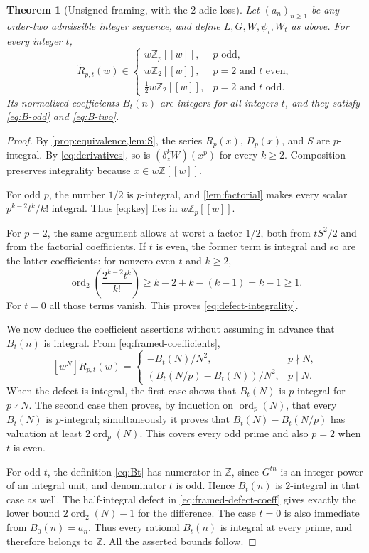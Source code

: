 \documentclass[11pt,letterpaper]{article}
\numberwithin{equation}{section}
\newtheorem{theorem}{Theorem}[section]
\theoremstyle{definition}
\theoremstyle{remark}
\newcommand{\Z}{\mathbb Z}
\newcommand{\Zp}{\mathbb Z_p}
\newcommand{\vp}{\operatorname{ord}_p}
\newcommand{\vtwo}{\operatorname{ord}_2}
\begin{document}
\begin{theorem}[Unsigned framing, with the $2$-adic loss]\label{thm:framing}
Let $(a_n)_{n\ge1}$ be any order-two admissible integer sequence,
and define $L,G,W,\psi_t,W_t$ as above. For every integer $t$,
\begin{equation}\label{eq:defect-integrality}
 \widetilde R_{p,t}(w)\in
 \begin{cases}
 w\Zp[[w]],&p\text{ odd},\\
 w\Z_2[[w]],&p=2\text{ and }t\text{ even},\\
 \tfrac12 w\Z_2[[w]],&p=2\text{ and }t\text{ odd}.
 \end{cases}
\end{equation}
Its normalized coefficients $B_t(n)$ are integers for all integers $t$,
and they satisfy \eqref{eq:B-odd} and \eqref{eq:B-two}.
\end{theorem}
\begin{proof}
By \cref{prop:equivalence,lem:S}, the series $R_p(x)$, $D_p(x)$, and $S$
are $p$-integral. By \eqref{eq:derivatives}, so is
$(\delta_z^kW)(x^p)$ for every $k\ge2$. Composition preserves integrality
because $x\in w\Z[[w]]$.

For odd $p$, the number $1/2$ is $p$-integral, and
\cref{lem:factorial} makes every scalar $p^{k-2}t^k/k!$ integral.
Thus \eqref{eq:key} lies in $w\Zp[[w]]$.

For $p=2$, the same argument allows at worst a factor $1/2$, both from
$tS^2/2$ and from the factorial coefficients. If $t$ is even, the former
term is integral and so are the latter coefficients: for nonzero even
$t$ and $k\ge2$,
\[
 \vtwo\left(\frac{2^{k-2}t^k}{k!}\right)
 \ge k-2+k-(k-1)=k-1\ge1.
\]
For $t=0$ all those terms vanish. This proves
\eqref{eq:defect-integrality}.

We now deduce the coefficient assertions without assuming in advance
that $B_t(n)$ is integral. From \eqref{eq:framed-coefficients},
\begin{equation}\label{eq:framed-defect-coeff}
 [w^N]\widetilde R_{p,t}(w)=
 \begin{cases}
 -B_t(N)/N^2,&p\nmid N,\\
 (B_t(N/p)-B_t(N))/N^2,&p\mid N.
 \end{cases}
\end{equation}
When the defect is integral, the first case shows that $B_t(N)$ is
$p$-integral for $p\nmid N$. The second case then proves, by induction
on $\vp(N)$, that every $B_t(N)$ is $p$-integral; simultaneously it proves
that $B_t(N)-B_t(N/p)$ has valuation at least $2\vp(N)$.
This covers every odd prime and also $p=2$ when $t$ is even.

For odd $t$, the definition \eqref{eq:Bt} has numerator in $\Z$, since
$G^{tn}$ is an integer power of an integral unit, and denominator $t$
is odd. Hence $B_t(n)$ is $2$-integral in that case as well. The half-integral
defect in \eqref{eq:framed-defect-coeff} gives exactly the lower bound
$2\vtwo(N)-1$ for the difference. The case $t=0$ is also immediate from
$B_0(n)=a_n$. Thus every rational $B_t(n)$ is integral at every prime,
and therefore belongs to $\Z$. All the asserted bounds follow.
\end{proof}
\end{document}
